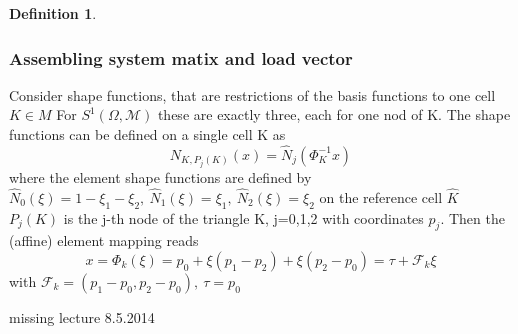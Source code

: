 \documentclass[english]{article}
\theoremstyle{definition}
\newtheorem*{defi}{Definition}
\theoremstyle{remark}
\newcommand{\M}{\mathcal{M}}
\newcommand{\F}{\mathcal{F}}
\newcommand{\OO}{\Omega}
\begin{document}
\begin{defi}
    \subsubsection{Assembling system matix and load vector}
    Consider shape functions, that are restrictions of the basis functions to one cell $K \in M$ For $S^1(\OO,\M)$ these are exactly three, each for one nod of K. The shape functions can be defined on a single cell K as 
    $$N_{K,P_j(K)}(x) = \hat N_j(\Phi^{-1}_K x)$$
    where the element shape functions are defined by $\hat N_0(\xi ) = 1 - \xi_1-\xi_2, \ \hat N_1(\xi) =\xi_1 , \ \hat N_2(\xi) = \xi_2  $ on the reference cell $\hat K$\\

    $P_j(K) $ is the j-th node of the triangle K, j=0,1,2 with coordinates $p_j$. Then the (affine) element mapping reads 
    $$x= \Phi_k(\xi) = p_0 + \xi(p_1-p_2)+\xi(p_2-p_0) = \tau + \F_k \xi$$
    with $\F_k= (p_1-p_0,p_2-p_0) , \ \tau = p_0$
  \end{defi}
  \printindex  %



missing lecture 8.5.2014
\end{document}
